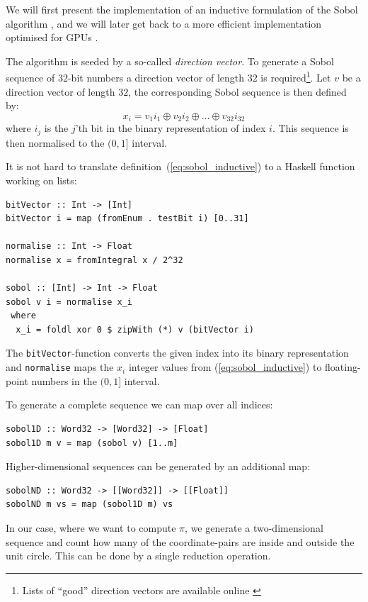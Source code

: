 \documentclass[preprint]{sigplanconf}
\begin{document}
We will first present the implementation of an inductive formulation
of the Sobol algorithm \cite{bratley1988algorithm}, and we will later
get back to a more efficient implementation optimised for GPUs
\cite[Chapter~16]{hwy2011emerald}.

The algorithm is seeded by a so-called \emph{direction vector}. To
generate a Sobol sequence of $32$-bit numbers a direction vector of
length $32$ is required\footnote{Lists of ``good'' direction vectors are
  available online \cite{homepage:sobol:directionvectors}}. Let $v$ be
a direction vector of length $32$, the corresponding Sobol sequence is
then defined by:
\begin{equation}
x_i = v_1i_1 \oplus v_2i_2 \oplus \ldots \oplus v_{32}i_{32}\label{eq:sobol_inductive}
\end{equation}
where $i_j$ is the $j$'th bit in the binary representation of index
$i$. This sequence is then normalised to the $(0,1]$ interval.

It is not hard to translate definition~(\ref{eq:sobol_inductive}) to a
Haskell function working on lists:
\begin{verbatim}
bitVector :: Int -> [Int]
bitVector i = map (fromEnum . testBit i) [0..31]

normalise :: Int -> Float
normalise x = fromIntegral x / 2^32

sobol :: [Int] -> Int -> Float
sobol v i = normalise x_i
 where
  x_i = foldl xor 0 $ zipWith (*) v (bitVector i)
\end{verbatim}
The \verb|bitVector|-function converts the given index into its binary
representation and \verb|normalise| maps the $x_i$ integer values from
(\ref{eq:sobol_inductive}) to floating-point numbers in the $(0,1]$
interval.

To generate a complete sequence we can map over all indices:
\begin{verbatim}
sobol1D :: Word32 -> [Word32] -> [Float]
sobol1D m v = map (sobol v) [1..m]
\end{verbatim}
Higher-dimensional sequences can be generated by an additional map:
\begin{verbatim}
sobolND :: Word32 -> [[Word32]] -> [[Float]]
sobolND m vs = map (sobol1D m) vs
\end{verbatim}

In our case, where we want to compute $\pi$, we generate a
two-dimensional sequence and count how many of the coordinate-pairs
are inside and outside the unit circle. This can be done by a single
reduction operation.
\end{document}
